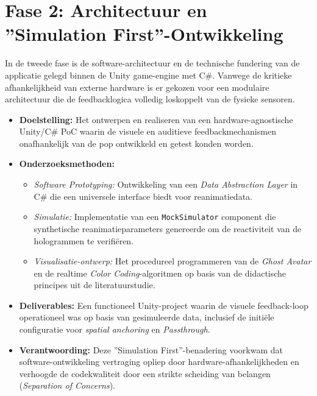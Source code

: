 \section{Fase 2: Architectuur en ''Simulation First''-Ontwikkeling}
In de tweede fase is de software-architectuur en de technische fundering van de applicatie gelegd binnen de Unity game-engine met C\#. 
Vanwege de kritieke afhankelijkheid van externe hardware is er gekozen voor een modulaire architectuur die de 
feedbacklogica volledig loskoppelt van de fysieke sensoren.
\begin{itemize}
    \item \textbf{Doelstelling:} Het ontwerpen en realiseren van een hardware-agnostische Unity/C\# PoC waarin de visuele en auditieve 
    feedbackmechanismen onafhankelijk van de pop ontwikkeld en getest konden worden.
    \item \textbf{Onderzoeksmethoden:} 
        \begin{itemize}
            \item \textit{Software Prototyping:} Ontwikkeling van een \textit{Data Abstraction Layer} in C\# die een universele interface biedt voor reanimatiedata.
            \item \textit{Simulatie:} Implementatie van een \texttt{MockSimulator} component die synthetische reanimatieparameters genereerde om de reactiviteit 
            van de hologrammen te verifiëren.
            \item \textit{Visualisatie-ontwerp:} Het procedureel programmeren van de \textit{Ghost Avatar} en de realtime \textit{Color Coding}-algoritmen op basis 
            van de didactische principes uit de literatuurstudie.
        \end{itemize}
    \item \textbf{Deliverables:} Een functioneel Unity-project waarin de visuele feedback-loop operationeel was op basis van gesimuleerde data, inclusief de initiële 
    configuratie voor \textit{spatial anchoring} en \textit{Passthrough}.
    \item \textbf{Verantwoording:} Deze ''Simulation First''-benadering voorkwam dat software-ontwikkeling vertraging opliep door hardware-afhankelijkheden en verhoogde 
    de codekwaliteit door een strikte scheiding van belangen (\textit{Separation of Concerns}).
\end{itemize}

